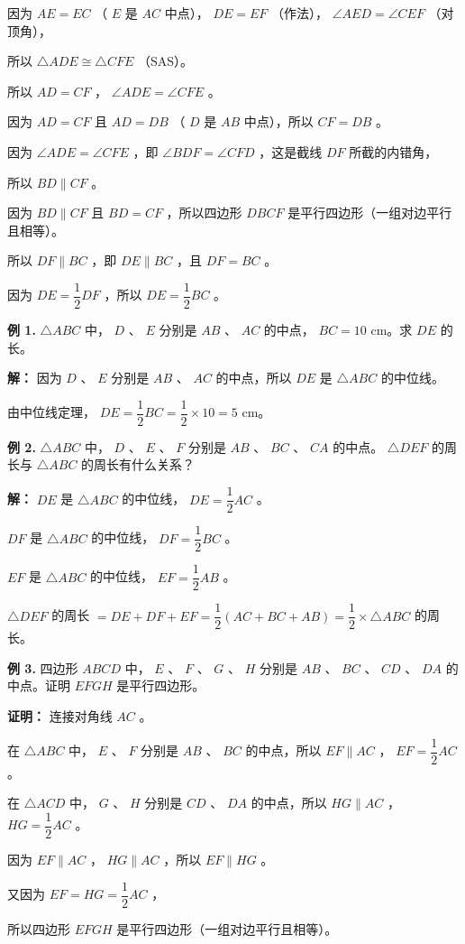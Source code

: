 \begin{understand}
因为 $AE = EC$ （ $E$ 是 $AC$ 中点）， $DE = EF$ （作法）， $\angle AED = \angle CEF$ （对顶角），

所以 $\triangle ADE \cong \triangle CFE$ （SAS）。

所以 $AD = CF$ ， $\angle ADE = \angle CFE$ 。

因为 $AD = CF$ 且 $AD = DB$ （ $D$ 是 $AB$ 中点），所以 $CF = DB$ 。

因为 $\angle ADE = \angle CFE$ ，即 $\angle BDF = \angle CFD$ ，这是截线 $DF$ 所截的内错角，

所以 $BD \parallel CF$ 。

因为 $BD \parallel CF$ 且 $BD = CF$ ，所以四边形 $DBCF$ 是平行四边形（一组对边平行且相等）。

所以 $DF \parallel BC$ ，即 $DE \parallel BC$ ，且 $DF = BC$ 。

因为 $DE = \dfrac{1}{2}DF$ ，所以 $DE = \dfrac{1}{2}BC$ 。

\end{understand}

\begin{workedexamples}


\textbf{例 1.} $\triangle ABC$ 中， $D$ 、 $E$ 分别是 $AB$ 、 $AC$ 的中点， $BC = 10$ cm。求 $DE$ 的长。

\textbf{解：}
因为 $D$ 、 $E$ 分别是 $AB$ 、 $AC$ 的中点，所以 $DE$ 是 $\triangle ABC$ 的中位线。

由中位线定理， $DE = \dfrac{1}{2}BC = \dfrac{1}{2} \times 10 = 5$ cm。

\textbf{例 2.} $\triangle ABC$ 中， $D$ 、 $E$ 、 $F$ 分别是 $AB$ 、 $BC$ 、 $CA$ 的中点。 $\triangle DEF$ 的周长与 $\triangle ABC$ 的周长有什么关系？

\textbf{解：}
$DE$ 是 $\triangle ABC$ 的中位线， $DE = \dfrac{1}{2}AC$ 。

$DF$ 是 $\triangle ABC$ 的中位线， $DF = \dfrac{1}{2}BC$ 。

$EF$ 是 $\triangle ABC$ 的中位线， $EF = \dfrac{1}{2}AB$ 。

$\triangle DEF$ 的周长 $= DE + DF + EF = \dfrac{1}{2}(AC + BC + AB) = \dfrac{1}{2} \times \triangle ABC$ 的周长。

\textbf{例 3.} 四边形 $ABCD$ 中， $E$ 、 $F$ 、 $G$ 、 $H$ 分别是 $AB$ 、 $BC$ 、 $CD$ 、 $DA$ 的中点。证明 $EFGH$ 是平行四边形。

\textbf{证明：}
连接对角线 $AC$ 。

在 $\triangle ABC$ 中， $E$ 、 $F$ 分别是 $AB$ 、 $BC$ 的中点，所以 $EF \parallel AC$ ， $EF = \dfrac{1}{2}AC$ 。

在 $\triangle ACD$ 中， $G$ 、 $H$ 分别是 $CD$ 、 $DA$ 的中点，所以 $HG \parallel AC$ ， $HG = \dfrac{1}{2}AC$ 。

因为 $EF \parallel AC$ ， $HG \parallel AC$ ，所以 $EF \parallel HG$ 。

又因为 $EF = HG = \dfrac{1}{2}AC$ ，

所以四边形 $EFGH$ 是平行四边形（一组对边平行且相等）。

\end{workedexamples}

